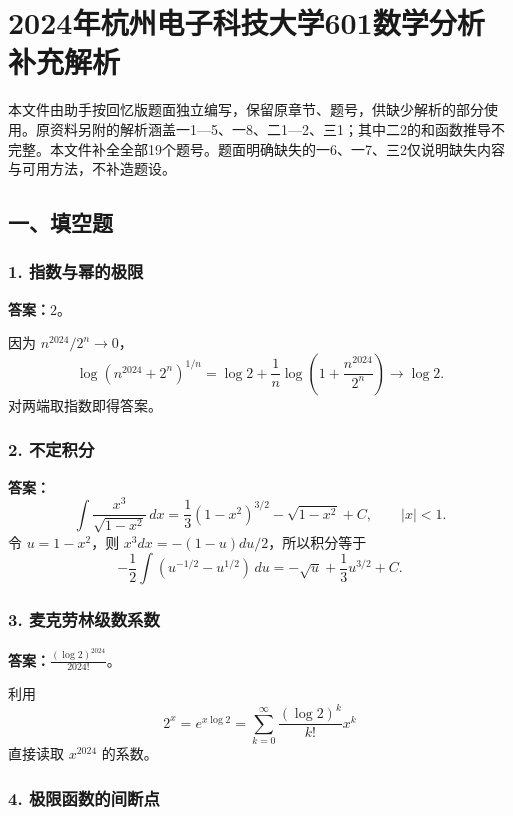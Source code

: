 \documentclass[11pt,fontset=fandol]{ctexart}
\begin{document}
\section{2024年杭州电子科技大学601数学分析补充解析}\label{ux5e74ux676dux5ddeux7535ux5b50ux79d1ux6280ux5927ux5b66601ux6570ux5b66ux5206ux6790ux8865ux5145ux89e3ux6790}

本文件由助手按回忆版题面独立编写，保留原章节、题号，供缺少解析的部分使用。原资料另附的解析涵盖一1---5、一8、二1---2、三1；其中二2的和函数推导不完整。本文件补全全部19个题号。题面明确缺失的一6、一7、三2仅说明缺失内容与可用方法，不补造题设。

\subsection{一、填空题}\label{ux4e00ux586bux7a7aux9898}

\subsubsection{1.
指数与幂的极限}\label{ux6307ux6570ux4e0eux5e42ux7684ux6781ux9650}

\textbf{答案：}\(2\)。

因为 \(n^{2024}/2^n\to0\)， \[
\log (n^{2024}+2^n)^{1/n}
=\log2+\frac1n\log\left(1+\frac{n^{2024}}{2^n}\right)\to\log2.
\] 对两端取指数即得答案。

\subsubsection{2. 不定积分}\label{ux4e0dux5b9aux79efux5206}

\textbf{答案：} \[
\int\frac{x^3}{\sqrt{1-x^2}}\,dx
=\frac13(1-x^2)^{3/2}-\sqrt{1-x^2}+C,\qquad |x|<1.
\] 令 \(u=1-x^2\)，则 \(x^3dx=-(1-u)du/2\)，所以积分等于 \[
-\frac12\int(u^{-1/2}-u^{1/2})\,du=-\sqrt u+\frac13u^{3/2}+C.
\]

\subsubsection{3.
麦克劳林级数系数}\label{ux9ea6ux514bux52b3ux6797ux7ea7ux6570ux7cfbux6570}

\textbf{答案：}\(\displaystyle\frac{(\log2)^{2024}}{2024!}\)。

利用 \[
2^x=e^{x\log2}=\sum_{k=0}^\infty\frac{(\log2)^k}{k!}x^k
\] 直接读取 \(x^{2024}\) 的系数。

\subsubsection{4.
极限函数的间断点}\label{ux6781ux9650ux51fdux6570ux7684ux95f4ux65adux70b9}
\end{document}
